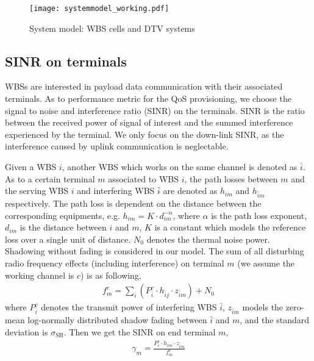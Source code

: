 \begin{figure}[h!]
  \centering
  \texttt{[image: systemmodel\_working.pdf]}
  \caption{System model: WBS cells and DTV systems}
\label{sysmodel}
\end{figure}

\subsection{SINR on terminals}
WBSs are interested in payload data communication with their associated terminals. 
As to performance metric for the \gls{QoS} provisioning, we choose the signal to noise and interference ratio (\gls{SINR}) on the terminals.
SINR is the ratio between the received power of signal of interest and the summed interference experienced by the terminal. 
We only focus on the down-link SINR, as the interference caused by uplink communication is neglectable.

Given a WBS $i$, another WBS which works on the same channel is denoted as $\bar{i}$.
As to a certain terminal $m$ associated to WBS $i$, the path losses between $m$ and the serving WBS $i$ and interfering WBS $\bar{i}$ are denoted as $h_{im}$ and $h_{\bar{i}m}$ respectively.
The path loss is dependent on the distance between the corresponding equipments, e.g. $h_{im}=K \cdot d_{im}^{-\alpha}$, where $\alpha$ is the path loss exponent, $d_{im}$ is the distance between $i$ and $m$, $K$ is a constant which models the reference loss over a single unit of distance.  
$N_0$ denotes the thermal noise power.
Shadowing without fading is considered in our model.
The sum of all disturbing radio frequency effects (including interference) on terminal $m$ (we assume the working channel is $c$) is as following,
\begin{equation}
\label{interference}
\begin{aligned}
f_m^c=\sum_{\bar{i}} (P_{\bar{i}}^c \cdot h_{\bar{i}j} \cdot z_{\bar{i}m}) +  N_0
\end{aligned}
\end{equation}
where $P_{\bar{i}}^c$ denotes the transmit power of interfering WBS $\bar{i}$, $z_{\bar{i}m}$ models the zero-mean log-normally distributed shadow fading between $\bar{i}$ and $m$, and the standard deviation is $\sigma_{\text{SH}}$.
Then we get the \gls{SINR} on end terminal $m$,
\begin{equation}
\label{SINR}
\begin{aligned}
\gamma_{m} = \frac{P_{i}^c \cdot h_{im}\cdot z_{\bar{i}m}} {f_m^c}
\end{aligned}
\end{equation}




